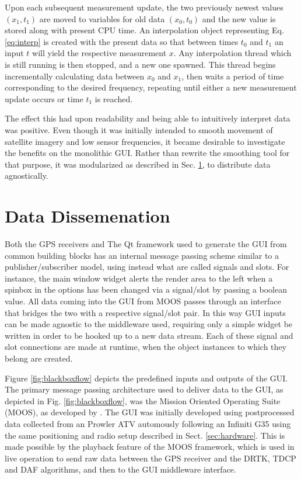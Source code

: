 Upon each subsequent measurement update, the two previously newest values $(x_1,t_1)$ are moved to variables for old data $(x_0, t_0)$ and the new value is stored along with present CPU time. An interpolation object representing Eq. \eqref{eq:interp} is created with the present data so that between times $t_0$ and $t_1$ an input $t$ will yield the respective measurement $x$. Any interpolation thread which is still running is then stopped, and a new one spawned. This thread begins incrementally calculating data between $x_0$ and $x_1$, then waits a period of time corresponding to the desired frequency, repeating until either a new measurement update occurs or time $t_1$ is reached.

The effect this had upon readability and being able to intuitively interpret data was positive. Even though it was initially intended to smooth movement of satellite imagery and low sensor frequencies, it became desirable to investigate the benefits on the monolithic GUI. Rather than rewrite the smoothing tool for that purpose, it was modularized as described in Sec. \ref{sec:datadiss}, to distribute data agnostically.

\section{Data Dissemenation} \label{sec:datadiss}

Both the GPS receivers and 
The Qt \cite{qt} framework used to generate the GUI from common building blocks has an internal message passing scheme similar to a publisher/subscriber model, using instead what are called signals and slots. For instance, the main window widget alerts the render area to the left when a spinbox in the options has been changed via a signal/slot by passing a boolean value. All data coming into the GUI from MOOS passes through an interface that bridges the two with a respective signal/slot pair. In this way GUI inputs can be made agnostic to the middleware used, requiring only a simple widget be written in order to be hooked up to a new data stream. Each of these signal and slot connections are made at runtime, when the object instances to which they belong are created.

Figure \ref{fig:blackboxflow} depicts the predefined inputs and outputs of the GUI. The primary message passing architecture used to deliver data to the GUI, as depicted in Fig. \ref{fig:blackboxflow}, was the Mission Oriented Operating Suite (MOOS), as developed by \cite{moos}. The GUI was initially developed using postprocessed data collected from an Prowler ATV automously following an Infiniti G35 using the same positioning and radio setup described in Sect. \ref{sec:hardware}. This is made possible by the playback feature of the MOOS framework, which is used in live operation to send raw data between the GPS receiver and the DRTK, TDCP and DAF algorithms, and then to the GUI middleware interface.

